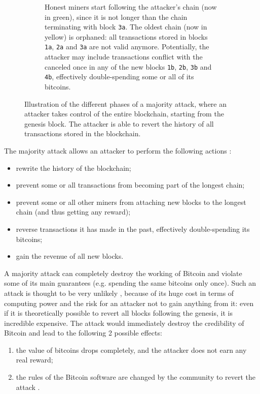 \begin{figure}[t!]
\begin{subfigure}{\textwidth}
		\vspace*{0.25cm}
		\caption{
			Honest miners start following the attacker's chain (now in green), since it is not longer than the chain terminating with block \texttt{3a}.
			The oldest chain (now in yellow) is orphaned: all transactions stored in blocks \texttt{1a}, \texttt{2a} and \texttt{3a} are not valid anymore.
			Potentially, the attacker may include transactions conflict with the canceled once in any of the new blocks \texttt{1b}, \texttt{2b}, \texttt{3b} and \texttt{4b}, effectively double-spending some or all of its bitcoins.
		}
		\vspace*{0.25cm}
	\end{subfigure}
	\caption[Illustration of the different phases of a majority attack]{
		Illustration of the different phases of a majority attack, where an attacker takes control of the entire blockchain, starting from the genesis block.
		The attacker is able to revert the history of all transactions stored in the blockchain.
	}
	\label{fig:majority-attack}
\end{figure}

The majority attack allows an attacker to perform the following actions \cite{weaknesses_bitcoin_wiki}:
\begin{itemize}
	\item rewrite the history of the blockchain;
	\item prevent some or all transactions from becoming part of the longest chain;
	\item prevent some or all other miners from attaching new blocks to the longest chain (and thus getting any reward);
	\item reverse transactions it has made in the past, effectively double-spending its bitcoins;
	\item gain the revenue of all new blocks.
\end{itemize}

A majority attack can completely destroy the working of Bitcoin and violate some of its main guarantees (e.g. spending the same bitcoins only once).
Such an attack is thought to be very unlikely \cite{ghash_never_51_attack_cex, ghash_never_51_attack_coindesk}, because of its huge cost in terms of computing power and the risk for an attacker not to gain anything from it:
even if it is theoretically possible to revert all blocks following the genesis, it is incredible expensive.
The attack would immediately destroy the credibility of Bitcoin and lead to the following \num{2} possible effects:
\begin{enumerate}
	\item the value of bitcoins drops completely, and the attacker does not earn any real reward;
	\item the rules of the Bitcoin software are changed by the community to revert the attack \cite{weaknesses_bitcoin_wiki}.
\end{enumerate}

